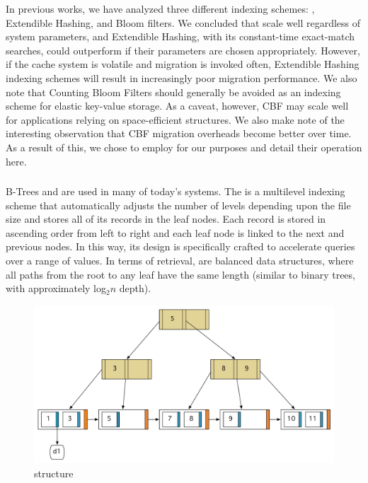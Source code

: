 In previous works\cite{chiu_ccgrid11,chiu_ijngc11}, we have analyzed three
different indexing schemes: \bptrees, Extendible Hashing, and Bloom filters. We
concluded that \bptrees scale well regardless of system parameters, and
Extendible Hashing, with its constant-time exact-match searches, could
outperform \bptrees if their parameters are chosen appropriately. However, if
the cache system is volatile and migration is invoked often, Extendible Hashing
indexing schemes will result in increasingly poor migration performance. We
also note that Counting Bloom Filters should generally be avoided as an
indexing scheme for elastic key-value storage. As a caveat, however, CBF may
scale well for applications relying on space-efficient structures. We also make
note of the interesting observation that CBF migration overheads become better
over time. As a result of this, we chose to employ \bptrees for our purposes
and detail their operation here.

\subsubsection{\bptrees} %
\label{subsub:b_trees}
B-Trees and \bptrees are used in many of today's systems. The \bptree is a
multilevel indexing scheme that automatically adjusts the number of levels
depending upon the file size and stores all of its records in the leaf nodes.
Each record is stored in ascending order from left to right and each leaf node
is linked to the next and previous nodes. In this way, its design is
specifically crafted to accelerate queries over a range of
values\cite{navathe,ullman}. In terms of retrieval, \bptrees are balanced data
structures, where all paths from the root to any leaf have the same length
(similar to binary trees, with approximately log$_2 n$ depth).

\begin{figure}
\begin{center}
\includegraphics[scale=0.5]{figures/bplustree.pdf}
\end{center}
\caption{\bptree structure}
\label{fig:bplustree}
\end{figure}

